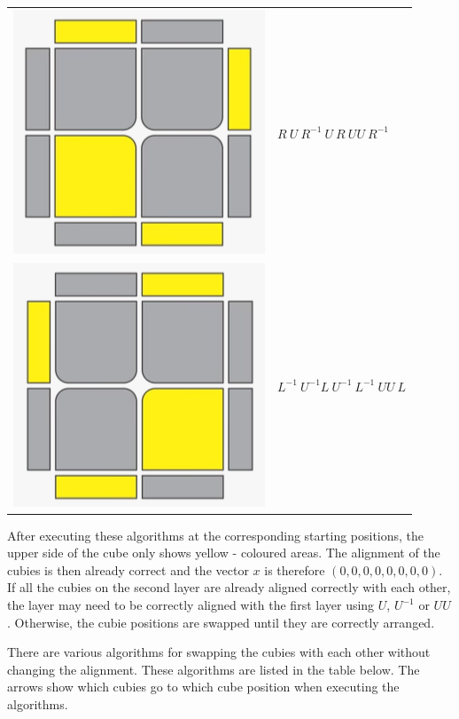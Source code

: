 \documentclass[12pt,a4paper]{article}
\theoremstyle{custom}
\begin{document}
\begin{center}
\begin{tabular}{m{4cm} m{6cm}}
\includegraphics[scale=0.4]{images/Upside-6.png} & $R \ U \ R^{-1} \ U \ R \ UU \ R^{-1}$ \\
\includegraphics[scale=0.4]{images/Upside-7.png} & $L^{-1} \ U^{-1} L \ U^{-1} \ L^{-1} \ UU \ L$ \\
\bottomrule

\end{tabular}
\end{center}

After executing these algorithms at the corresponding starting positions, the upper side of the cube only shows yellow - coloured areas. The alignment of the cubies is then already correct and the vector $x$ is therefore $(0,0,0,0,0,0,0,0)$. If all the cubies on the second layer are already aligned correctly with each other, the layer may need to be correctly aligned with the first layer using $U$, $U^{-1}$ or $UU$. Otherwise, the cubie positions are swapped until they are correctly arranged.

There are various algorithms for swapping the cubies with each other without changing the alignment. These algorithms are listed in the table below. The arrows show which cubies go to which cube position when executing the algorithms.
\end{document}

